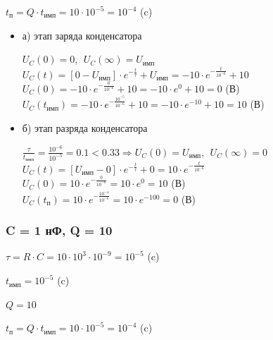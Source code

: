 		$t_\text{п} = Q \cdot t_\text{имп} = 10 \cdot 10^{-5} = 10^{-4}$ (c)
\begin{itemize}
\item[] а) этап заряда конденсатора

		$U_C(0) = 0,\ \ U_C(\infty) = U_\text{имп}$\\
		$U_C(t) = [0 - U_\text{имп}] \cdot e^{-\frac{t}{\tau}} + U_\text{имп} = -10 \cdot e^{-\frac{t}{10^{-6}}} + 10$\\
		$U_C(0) = -10 \cdot e^{-\frac{0}{10^{-6}}} + 10 = -10 \cdot e^0 + 10 = 0$ (В)\\
		$U_C(t_\text{имп}) = -10 \cdot e^{-\frac{10^{-5}}{10^{-6}}} + 10 = -10 \cdot e^{-10} + 10 = 10$ (В)\\

\item[] б) этап разряда конденсатора
		
		$\frac{\tau}{t_\text{имп}} = \frac{10^{-6}}{10^{-5}} = 0.1 < 0.33 \Rightarrow U_C(0) = U_\text{имп},\ \ U_C(\infty) = 0$\\
		$U_C(t) = [U_\text{имп} - 0] \cdot e^{-\frac{t}{\tau}} + 0 = 10 \cdot e^{-\frac{t}{10^{-6}}}$\\
		$U_C(0) = 10 \cdot e^{-\frac{0}{10^{-6}}} = 10 \cdot e^0 = 10$ (В)\\
		$U_C(t_\text{п}) = 10 \cdot e^{-\frac{10^{-4}}{10^{-6}}} = 10 \cdot e^{-100} = 0$ (В)\\
		
\end{itemize}

\subsubsection{C = 1 нФ, Q = 10}

		$\tau = R \cdot C = 10 \cdot 10^3 \cdot 10^{-9} = 10^{-5}$ (c)
		
		$t_\text{имп} = 10^{-5}$ (c)
		
		$Q = 10$		
		
		$t_\text{п} = Q \cdot t_\text{имп} = 10 \cdot 10^{-5} = 10^{-4}$ (c)

